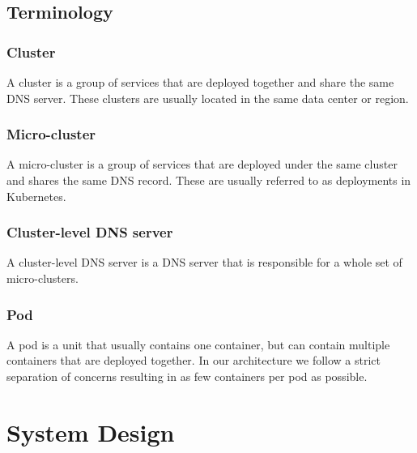 \documentclass[12pt]{article}
\begin{document}
\subsection{Terminology}
\subsubsection{Cluster}
    A cluster is a group of services that are deployed together and share the same DNS server.
    These clusters are usually located in the same data center or region.
\subsubsection{Micro-cluster}
    A micro-cluster is a group of services that are deployed under the same cluster and shares the same DNS record.
    These are usually referred to as deployments in Kubernetes.
\subsubsection{Cluster-level DNS server}
    A cluster-level DNS server is a DNS server that is responsible for a whole set of micro-clusters.
\subsubsection{Pod}
    A pod is a unit that usually contains one container, but can contain multiple containers that are deployed together.
    In our architecture we follow a strict separation of concerns resulting in as few containers per pod as possible.

\section{System Design}
\end{document}

